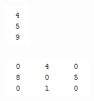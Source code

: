 \documentclass{article}
\begin{document}
\begin{figure}[H]
\begin{subfigure}[b]{0.1\textwidth}
		\includegraphics[width=\linewidth]{example_idlist}
		\caption{}
		\label{fig: example_idxlist}
	\end{subfigure}
	\hspace{\fill}
	\begin{subfigure}[b]{0.33\textwidth}
		\includegraphics[width=\linewidth]{example_adj}

\end{subfigure}
\end{figure}
\end{document}
